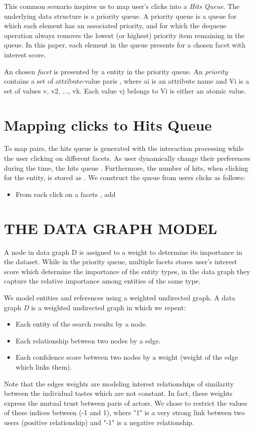 This common scenario inspires us to map user's clicks into a {\it Hits Queue}. The underlying data structure is a priority queue. A priority queue is a queue for which each element has an associated priority, and for which the dequeue operation always removes the lowest (or highest) priority item remaining in the queue. In this paper, each element in the queue presents for a chosen facet with interest score. 

An chosen {\it facet} is presented by a entity in the priority queue. An {\it priority} contains a set of attribute-value paris , where ai is an attribute name and Vi is a set of values {v, v2, ..., vk}. Each value vj belongs to Vi is either an atomic value. 

\section{Mapping clicks to Hits Queue}

To map  pairs, the hits queue is generated with the interaction processing while the user clicking on different facets. As user dynamically change their preferences during the time, the hits queue . Furthermore, the number of hits, when clicking for the entity, is stored as . We construct the queue from users clicks as follows:
\begin{itemize}
\item From each click  on a facets , add 
\end{itemize}


\section{THE DATA GRAPH MODEL}
A node in data graph D is assigned to a weight to determine its importance in the dataset. While in the priority queue, multiple facets stores user's interest score which determine the importance of the entity types, in the data graph they capture the relative importance among entities of the same type. 

We model entities and references using a weighted undirected graph. A data graph {\it D} is a weighted undirected graph in which we repent:
\begin{itemize}
	\item Each entity of the search results by a node.
	\item Each relationship between two nodes by a edge.
	\item Each confidence score between two nodes by a weight (weight of the edge which links them).
\end{itemize}
Note that the edges weights are modeling interest relationships of similarity between the individual tastes which are not constant. In fact, these weights express the mutual trust between paris of actors. We chose to restrict the values of these indices between (-1 and 1), where "1" is a very strong link between two users (positive relationship) and "-1" is a negative relationship.

